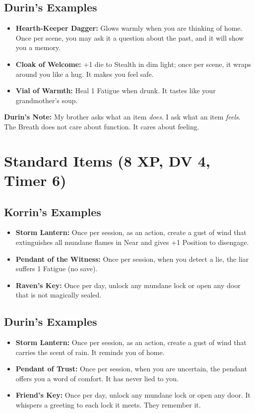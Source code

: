 \documentclass[11pt]{book}
\begin{document}
\subsection*{Durin's Examples}

\begin{itemize}
    \item \textbf{Hearth-Keeper Dagger:} Glows warmly when you are thinking of home. Once per scene, you may ask it a question about the past, and it will show you a memory.
    \item \textbf{Cloak of Welcome:} +1 die to Stealth in dim light; once per scene, it wraps around you like a hug. It makes you feel safe.
    \item \textbf{Vial of Warmth:} Heal 1 Fatigue when drunk. It tastes like your grandmother's soup.
\end{itemize}

\vspace{0.5cm}
\textbf{Durin's Note:} My brother asks what an item \textit{does}. I ask what an item \textit{feels}. The Breath does not care about function. It cares about feeling.

\newpage
\section{Standard Items (8 XP, DV 4, Timer 6)}

\subsection*{Korrin's Examples}

\begin{itemize}
    \item \textbf{Storm Lantern:} Once per session, as an action, create a gust of wind that extinguishes all mundane flames in Near and gives +1 Position to disengage.
    \item \textbf{Pendant of the Witness:} Once per session, when you detect a lie, the liar suffers 1 Fatigue (no save).
    \item \textbf{Raven's Key:} Once per day, unlock any mundane lock or open any door that is not magically sealed.
\end{itemize}

\subsection*{Durin's Examples}

\begin{itemize}
    \item \textbf{Storm Lantern:} Once per session, as an action, create a gust of wind that carries the scent of rain. It reminds you of home.
    \item \textbf{Pendant of Trust:} Once per session, when you are uncertain, the pendant offers you a word of comfort. It has never lied to you.
    \item \textbf{Friend's Key:} Once per day, unlock any mundane lock or open any door. It whispers a greeting to each lock it meets. They remember it.
\end{itemize}
\end{document}

